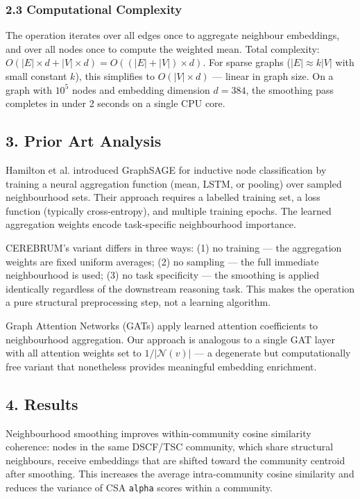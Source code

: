 \subsubsection*{2.3 Computational Complexity}
The operation iterates over all edges once to aggregate neighbour embeddings, and over all nodes once to compute the weighted mean. Total complexity: $O(|E| \times d + |V| \times d) = O((|E| + |V|) \times d)$. For sparse graphs ($|E| \approx k|V|$ with small constant $k$), this simplifies to $O(|V| \times d)$ --- linear in graph size. On a graph with $10^5$ nodes and embedding dimension $d = 384$, the smoothing pass completes in under 2 seconds on a single CPU core.

\subsection*{3. Prior Art Analysis}
Hamilton et al. \cite{hamilton2017graphsage} introduced GraphSAGE for inductive node classification by training a neural aggregation function (mean, LSTM, or pooling) over sampled neighbourhood sets. Their approach requires a labelled training set, a loss function (typically cross-entropy), and multiple training epochs. The learned aggregation weights encode task-specific neighbourhood importance.

CEREBRUM's variant differs in three ways: (1) no training --- the aggregation weights are fixed uniform averages; (2) no sampling --- the full immediate neighbourhood is used; (3) no task specificity --- the smoothing is applied identically regardless of the downstream reasoning task. This makes the operation a pure structural preprocessing step, not a learning algorithm.

Graph Attention Networks (GATs) \cite{velickovic2018gat} apply learned attention coefficients to neighbourhood aggregation. Our approach is analogous to a single GAT layer with all attention weights set to $1/|\mathcal{N}(v)|$ --- a degenerate but computationally free variant that nonetheless provides meaningful embedding enrichment.

\subsection*{4. Results}
Neighbourhood smoothing improves within-community cosine similarity coherence: nodes in the same DSCF/TSC community, which share structural neighbours, receive embeddings that are shifted toward the community centroid after smoothing. This increases the average intra-community cosine similarity and reduces the variance of CSA \texttt{alpha} scores within a community.

